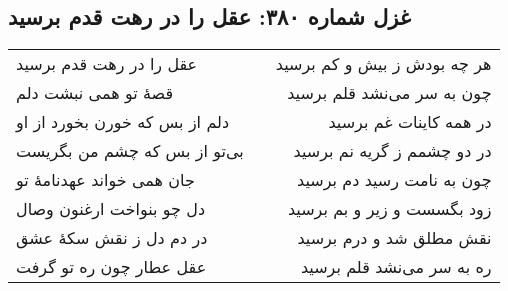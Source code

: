\begin{center}
\section*{غزل شماره ۳۸۰: عقل را در رهت قدم برسید}
\label{sec:380}
\begin{longtable}{l p{0.5cm} r}
عقل را در رهت قدم برسید
&&
هر چه بودش ز بیش و کم برسید
\\
قصهٔ تو همی نبشت دلم
&&
چون به سر می‌نشد قلم برسید
\\
دلم از بس که خورن بخورد از او
&&
در همه کاینات غم برسید
\\
بی‌تو از بس که چشم من بگریست
&&
در دو چشمم ز گریه نم برسید
\\
جان همی خواند عهدنامهٔ تو
&&
چون به نامت رسید دم برسید
\\
دل چو بنواخت ارغنون وصال
&&
زود بگسست و زیر و بم برسید
\\
در دم دل ز نقش سکهٔ عشق
&&
نقش مطلق شد و درم برسید
\\
عقل عطار چون ره تو گرفت
&&
ره به سر می‌نشد قلم برسید
\\
\end{longtable}
\end{center}

